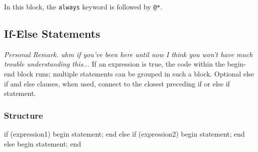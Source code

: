 \documentclass[12pt,openany]{book}
\begin{document}
In this block, the \texttt{always} keyword is followed by \texttt{@*}.

\subsection{If-Else Statements}
\textit{Personal Remark. uhm if you've been here until now I think you won't have much trouble understanding this...} \newline
If an expression is true, the code within the begin-end block runs; multiple statements can be grouped in such a block. Optional else if and else clauses, when used, connect to the closest preceding if or else if statement.
\noindent
\subsubsection{Structure}
\begin{vhdl}
if (expression1)
begin
	statement;
end
else if (expression2)
begin
	statement;
end
else
begin
	statement;
end
\end{vhdl}
\end{document}
